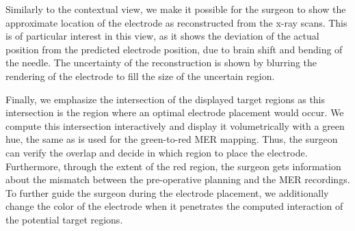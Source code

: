 \documentclass{vgtc}                          %
\begin{document}
Similarly to the contextual view, we make it possible for the surgeon to show the approximate location of the electrode as reconstructed from the x-ray scans. This is of particular interest in this view, as it shows the deviation of the actual position from the predicted electrode position, due to brain shift and bending of the needle. The uncertainty of the reconstruction is shown by blurring the rendering of the electrode to fill the size of the uncertain region.

Finally, we emphasize the intersection of the displayed target regions as this intersection is the region where an optimal electrode placement would occur. We compute this intersection interactively and display it volumetrically with a green hue, the same as is used for the green-to-red MER mapping. Thus, the surgeon can verify the overlap and decide in which region to place the electrode. Furthermore, through the extent of the red region, the surgeon gets information about the mismatch between the pre-operative planning and the MER recordings. To further guide the surgeon during the electrode placement, we additionally change the color of the electrode when it penetrates the computed interaction of the potential target regions.
\end{document}

